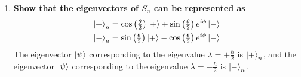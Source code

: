 \documentclass[11pt]{article}
\begin{document}
\begin{enumerate}[label=\textbf{\arabic*.}, start=2]
{\begin{enumerate}[label=\textbf{(\alph*)}]
{                    \textbf{\boldmath Show that the eigenvalues of \(S_n\) are \(\pm\frac{\hbar}{2}\), as expected from the S-G experiment.}
                    \begin{align*}
                        (S_n-\lambda I)\ket{\psi}&=\mathbf{0} \\
                        \left(\frac \hbar 2 \begin{bmatrix}\cos\theta & \sin(\theta)e^{-i\phi} \\ \sin(\theta)e^{i\phi} & -\cos\theta\end{bmatrix}-\begin{bmatrix}\lambda & 0 \\ 0 & \lambda\end{bmatrix}\right)\ket{\psi}&=\mathbf{0} \\
                        \begin{vmatrix}\frac \hbar 2 \cos\theta-\lambda & \frac \hbar 2 \sin(\theta)e^{-i\phi} \\ \frac \hbar 2 \sin(\theta)e^{i\phi} & -\frac \hbar 2 \cos\theta-\lambda\end{vmatrix}&=0 \\
                        -\left(\tfrac \hbar 2 \cos\theta-\lambda\right)\left(\tfrac \hbar 2 \cos\theta+\lambda\right)-\left(\tfrac \hbar 2 \sin\theta\right)^2\left(e^{i\phi-i\phi}\right)&=0 \\
                        -\left(\tfrac \hbar 2 \cos\theta\right)^2+\lambda^2-\left(\tfrac \hbar 2 \sin\theta\right)^2&=0 \\
                        \lambda^2&=\left(\tfrac \hbar 2 \cos\theta\right)^2+\left(\tfrac \hbar 2 \sin\theta\right)^2 \\
                        &=\left(\frac \hbar 2\right)^2 \\
                        \lambda&=\pm\frac \hbar 2
                    \end{align*}
                }
                \item{
                    \textbf{\boldmath Show that the eigenvectors of \(S_n\) can be represented as \begin{gather*}\ket{+}_n=\cos\left(\tfrac \theta 2\right)\ket{+}+\sin\left(\tfrac \theta 2\right)e^{i\phi}\ket{-} \\ \ket{-}_n=\sin\left(\tfrac \theta 2\right)\ket{+}-\cos\left(\tfrac \theta 2\right)e^{i\phi}\ket{-}\end{gather*}}%
                    The eigenvector \(\ket \psi\) corresponding to the eigenvalue \(\lambda=+\frac \hbar 2\) is \(\ket{+}_n\), and the eigenvector \(\ket \psi\) corresponding to the eigenvalue \(\lambda=-\frac \hbar 2\) is \(\ket{-}_n\).
}
\end{enumerate}}
\end{enumerate}
\end{document}
